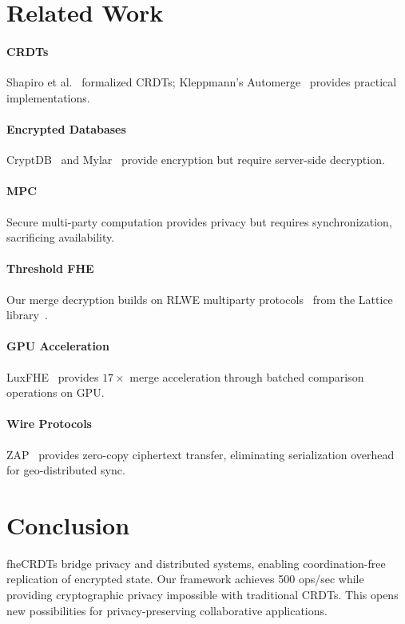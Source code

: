 \documentclass{../shared/luxfhe}
\begin{document}
\section{Related Work}

\paragraph{CRDTs} Shapiro et al.~\cite{shapiro2011} formalized CRDTs; Kleppmann's Automerge~\cite{automerge} provides practical implementations.

\paragraph{Encrypted Databases} CryptDB~\cite{cryptdb} and Mylar~\cite{mylar} provide encryption but require server-side decryption.

\paragraph{MPC} Secure multi-party computation provides privacy but requires synchronization, sacrificing availability.

\paragraph{Threshold FHE} Our merge decryption builds on RLWE multiparty protocols~\cite{mhe-rlwe,threshold-rlwe} from the Lattice library~\cite{lattice}.

\paragraph{GPU Acceleration} LuxFHE~\cite{luxcpp-fhe} provides $17\times$ merge acceleration through batched comparison operations on GPU.

\paragraph{Wire Protocols} ZAP~\cite{zap} provides zero-copy ciphertext transfer, eliminating serialization overhead for geo-distributed sync.

\section{Conclusion}

fheCRDTs bridge privacy and distributed systems, enabling coordination-free replication of encrypted state. Our framework achieves 500 ops/sec while providing cryptographic privacy impossible with traditional CRDTs. This opens new possibilities for privacy-preserving collaborative applications.



\end{document}

